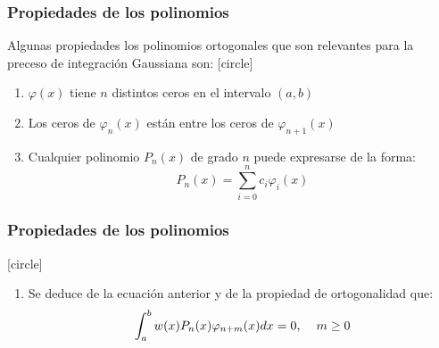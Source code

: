 \begin{frame}
\frametitle{Propiedades de los polinomios}
Algunas propiedades los polinomios ortogonales que son relevantes para la preceso de integración Gaussiana son:
[circle]
\begin{enumerate}[<+->]
\item $\varphi(x)$ tiene $n$ distintos ceros en el intervalo $(a,b)$
\item Los ceros de $\varphi_{n}(x)$ están entre los ceros de $\varphi_{n+1}(x)$
\item Cualquier polinomio $P_{n}(x)$ de grado $n$ puede expresarse de la forma:
\[ P_{n}(x) =  \sum_{i=0}^{n} c_{i} \varphi_{i} (x) \]
\seti
\end{enumerate}
\end{frame}
\begin{frame}
\frametitle{Propiedades de los polinomios}
[circle]
\begin{enumerate}
\conti
\item Se deduce de la ecuación anterior y de la propiedad de ortogonalidad que:
\fontsize{12}{12}\selectfont
\[ \int_{a}^{b} w(x) P_{n}(x) \varphi_{n+m} (x) dx = 0, \hspace{0.4cm} m \geq 0 \]
\end{enumerate}
\end{frame}
